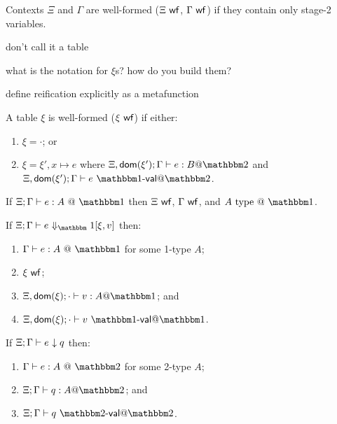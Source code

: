 \begin{definition}
Contexts $\Xi$ and $\Gamma$ are well-formed ($\Xi\ \mathsf{wf}$, $\Gamma\ \mathsf{wf}$) if they
contain only stage-2 variables.
\end{definition}

\noindent\TODO don't call it a table

\noindent\TODO what is the notation for $\xi$s? how do you build them?

\noindent\TODO define reification explicitly as a metafunction

\begin{definition}
A table $\xi$ is well-formed ($\xi\ \mathsf{wf}$) if either:
\begin{enumerate}
\item $\xi = \cdot$; or
\item $\xi = \xi',x\mapsto e$ where
$\Xi,\dom{\xi'};\Gamma\vdash e : B @ \bbtwo$ and
$\Xi,\dom{\xi'};\Gamma\vdash e \valot$.
\end{enumerate}
\end{definition}

\begin{theorem}
If $\Xi;\typesone e A$ then $\Xi\ \mathsf{wf}$, $\Gamma\ \mathsf{wf}$, and $A\istypeone$.
\end{theorem}

\begin{theorem}
If $\diaonesub$ then:
\begin{enumerate}
\item $\typesone e A$ for some 1-type $A$;
\item $\xi\ \mathsf{wf}$;
\item $\Xi,\dom\xi;\cdot\vdash v : A @ \bbone$; and
\item $\Xi,\dom\xi;\cdot\vdash v\valoo$.
\end{enumerate}
\end{theorem}

\begin{theorem}
If ${\Xi;\Gamma} \vdash {e_{}} \downarrow {q_{}}$ then:
\begin{enumerate}
\item $\typestwo e A$ for some 2-type $A$;
\item $\Xi;\Gamma\vdash q : A @ \bbtwo$; and
\item $\Xi;\Gamma\vdash q\valtt$.
\end{enumerate}
\end{theorem}


